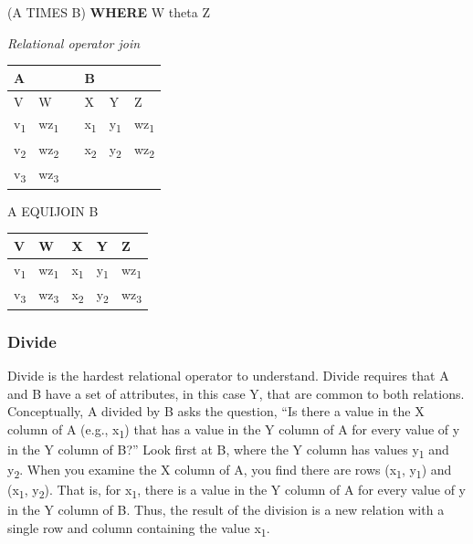 \documentclass[
]{article}
\newenvironment{Shaded}{\begin{snugshade}}{\end{snugshade}}
\newcommand{\KeywordTok}[1]{\textcolor[rgb]{0.13,0.29,0.53}{\textbf{#1}}}
\newcommand{\NormalTok}[1]{#1}
\begin{document}
\begin{Shaded}
\begin{Highlighting}[]
\NormalTok{(A TIMES B) }\KeywordTok{WHERE}\NormalTok{ W theta Z}
\end{Highlighting}
\end{Shaded}

\emph{Relational operator join}

\begin{longtable}[]{@{}llllll@{}}
\toprule
A & & & B & & \\
\midrule
\endhead
V & W & & X & Y & Z \\
v\textsubscript{1} & wz\textsubscript{1} & & x\textsubscript{1} & y\textsubscript{1} & wz\textsubscript{1} \\
v\textsubscript{2} & wz\textsubscript{2} & & x\textsubscript{2} & y\textsubscript{2} & wz\textsubscript{2} \\
v\textsubscript{3} & wz\textsubscript{3} & & & & \\
\bottomrule
\end{longtable}

A EQUIJOIN B

\begin{longtable}[]{@{}lllll@{}}
\toprule
V & W & X & Y & Z \\
\midrule
\endhead
v\textsubscript{1} & wz\textsubscript{1} & x\textsubscript{1} & y\textsubscript{1} & wz\textsubscript{1} \\
v\textsubscript{3} & wz\textsubscript{3} & x\textsubscript{2} & y\textsubscript{2} & wz\textsubscript{3} \\
\bottomrule
\end{longtable}

\hypertarget{divide}{%
\subsubsection*{Divide}\label{divide}}

Divide is the hardest relational operator to understand. Divide requires
that A and B have a set of attributes, in this case Y, that are common
to both relations. Conceptually, A divided by B asks the question, ``Is
there a value in the X column of A (e.g., x\textsubscript{1}) that has a value in the
Y column of A for every value of y in the Y column of B?'' Look first at
B, where the Y column has values y\textsubscript{1} and y\textsubscript{2}. When you examine the X
column of A, you find there are rows (x\textsubscript{1}, y\textsubscript{1}) and (x\textsubscript{1}, y\textsubscript{2}). That
is, for x\textsubscript{1}, there is a value in the Y column of A for every value of y
in the Y column of B. Thus, the result of the division is a new relation
with a single row and column containing the value x\textsubscript{1}.
\end{document}
